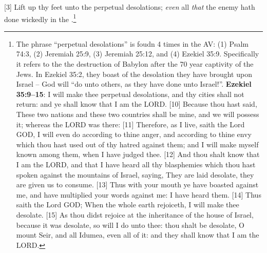 [3] \textcolor[rgb]{0.00,0.00,1.00}{Lift up thy feet unto the perpetual desolations; \emph{even} all \emph{that} the enemy hath done wickedly in the .}\footnote{The phrase ``perpetual desolations'' is foudn 4 times in the AV: (1) Psalm 74:3, (2) Jeremiah 25:9, (3) Jeremiah 25:12, and (4) Ezekiel 35:9. Specifically it refers to the the destruction of Babylon after the 70  year captivity of the Jews. In Ezekiel 35:2, they boast of the desolation they have brought upon Israel -- God will ``do unto others, as they have done unto Israel!''. \textbf{Ezekiel 35:9--15}: I will make thee perpetual desolations, and thy cities shall not return: and ye shall know that I am the LORD. [10] Because thou hast said, These two nations and these two countries shall be mine, and we will possess it; whereas the LORD was there: [11] Therefore, as I live, saith the Lord GOD, I will even do according to thine anger, and according to thine envy which thou hast used out of thy hatred against them; and I will make myself known among them, when I have judged thee. [12] And thou shalt know that I am the LORD, and that I have heard all thy blasphemies which thou hast spoken against the mountains of Israel, saying, They are laid desolate, they are given us to consume. [13] Thus with your mouth ye have boasted against me, and have multiplied your words against me: I have heard them. [14] Thus saith the Lord GOD; When the whole earth rejoiceth, I will make thee desolate. [15] As thou didst rejoice at the inheritance of the house of Israel, because it was desolate, so will I do unto thee: thou shalt be desolate, O mount Seir, and all Idumea, even all of it: and they shall know that I am the LORD.}
